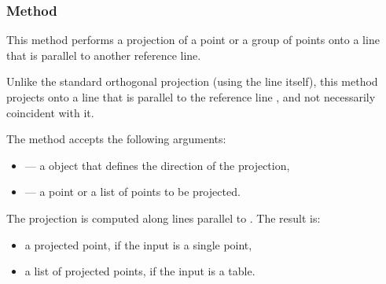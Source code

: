 
\subsubsection{Method } %
\label{ssub:method_line_projection__ll}

This method performs a projection of a point or a group of points onto a line that is parallel to another reference line.

\medskip
\noindent
Unlike the standard orthogonal projection (using the line itself), this method projects onto a line that is parallel to the reference line , and not necessarily coincident with it.

\medskip
\noindent
The method accepts the following arguments:
\begin{itemize}
  \item {} — a  object that defines the direction of the projection,
  \item {} — a point or a list of points to be projected.
\end{itemize}

\noindent
The projection is computed along lines parallel to . The result is:
\begin{itemize}
  \item a projected point, if the input is a single point,
  \item a list of projected points, if the input is a table.
\end{itemize}

\vspace{1em}

\begin{tkzexample}[latex=.5\textwidth]
\begin{center}
\end{center}

\end{tkzexample}

